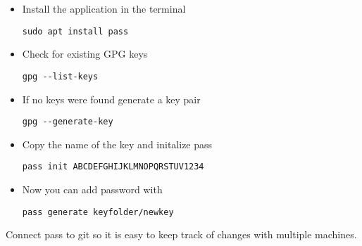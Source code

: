 \documentclass{article}
\begin{document}
\begin{itemize}
\item Install the application in the terminal \\
\begin{verbatim}
sudo apt install pass  
\end{verbatim}
\item Check for existing GPG keys \\
\begin{verbatim}
gpg --list-keys 
\end{verbatim}
\item If no keys were found generate a key pair \\
\begin{verbatim}
gpg --generate-key
\end{verbatim}
\item Copy the name of the key and initalize pass\\
\begin{verbatim}
pass init ABCDEFGHIJKLMNOPQRSTUV1234 
\end{verbatim}
  \item Now you can add password with \\
\begin{verbatim}
pass generate keyfolder/newkey 
\end{verbatim}
\end{itemize}

Connect pass to git so it is easy to keep track of changes with multiple machines.
\end{document}

